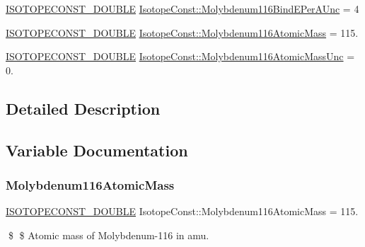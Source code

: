 \begin{DoxyCompactItemize}
\mbox{\hyperlink{group___isotope_const-_macros_ga8f45a7272ce02c0b4c65c44636ed719a}{I\+S\+O\+T\+O\+P\+E\+C\+O\+N\+S\+T\+\_\+\+D\+O\+U\+B\+LE}} \mbox{\hyperlink{group___isotope_const-_molybdenum-_mo116_gaed21d0196e9e9092ab68f22711df3eb9}{Isotope\+Const\+::\+Molybdenum116\+Bind\+E\+Per\+A\+Unc}} = 4
\item 
\mbox{\hyperlink{group___isotope_const-_macros_ga8f45a7272ce02c0b4c65c44636ed719a}{I\+S\+O\+T\+O\+P\+E\+C\+O\+N\+S\+T\+\_\+\+D\+O\+U\+B\+LE}} \mbox{\hyperlink{group___isotope_const-_molybdenum-_mo116_ga04af71ae3ffd8fd81b407d1bdd6e47a9}{Isotope\+Const\+::\+Molybdenum116\+Atomic\+Mass}} = 115.
\item 
\mbox{\hyperlink{group___isotope_const-_macros_ga8f45a7272ce02c0b4c65c44636ed719a}{I\+S\+O\+T\+O\+P\+E\+C\+O\+N\+S\+T\+\_\+\+D\+O\+U\+B\+LE}} \mbox{\hyperlink{group___isotope_const-_molybdenum-_mo116_gac134571e47b3842e5aa10baed5b3df28}{Isotope\+Const\+::\+Molybdenum116\+Atomic\+Mass\+Unc}} = 0.
\end{DoxyCompactItemize}


\subsection{Detailed Description}


\subsection{Variable Documentation}
\mbox{\label{group___isotope_const-_molybdenum-_mo116_ga04af71ae3ffd8fd81b407d1bdd6e47a9}} 
\subsubsection{\texorpdfstring{Molybdenum116\+Atomic\+Mass}{Molybdenum116AtomicMass}}
{\footnotesize\ttfamily \mbox{\hyperlink{group___isotope_const-_macros_ga8f45a7272ce02c0b4c65c44636ed719a}{I\+S\+O\+T\+O\+P\+E\+C\+O\+N\+S\+T\+\_\+\+D\+O\+U\+B\+LE}} Isotope\+Const\+::\+Molybdenum116\+Atomic\+Mass = 115.}

\$ \$ Atomic mass of Molybdenum-\/116 in amu. \mbox{\label{group___isotope_const-_molybdenum-_mo116_gac134571e47b3842e5aa10baed5b3df28}} 

